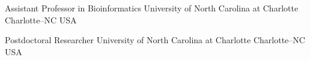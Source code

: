 \documentclass[11pt, letterpaper, sans]{moderncv}
\begin{document}
    {Assistant Professor in Bioinformatics}
    {University of North Carolina at Charlotte}
    {Charlotte--NC}
    {USA}
    {}

    {Postdoctoral Researcher}
    {University of North Carolina at Charlotte}
    {Charlotte--NC}
    {USA}
    {}
\end{document}
